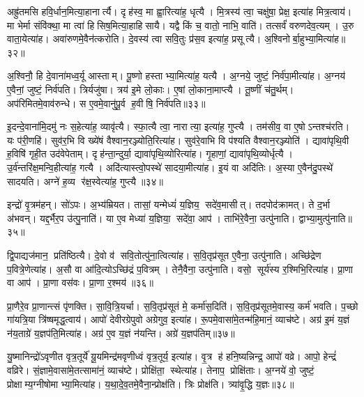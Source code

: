 अह्रु॑तमसि हवि॒र्धान॒मित्या॒हानार्त्यै।
दृह॑स्व॒ मा ह्वा॒रित्या॑ह॒ धृत्यै।
मि॒त्रस्य॑ त्वा॒ चक्षु॑षा॒ प्रेक्ष॒ इत्या॑ह मित्र॒त्वाय॑।
मा भेर्मा संवि॑क्था॒ मा त्वा॑ हिसिष॒मित्या॒हाहिसायै।
यद्वै किं च॒ वातो॒ नाभि॒ वाति॑।
तत्सर्वं॑ वरुणदेव॒त्यम्।
उ॒रु वाता॒येत्या॑ह।
अवा॑रुणमे॒वैन॑त्करोति।
दे॒वस्य॑ त्वा सवि॒तुः प्र॑स॒व इत्या॑ह॒ प्रसूत्यै।
अ॒श्विनोर्बा॒हुभ्या॒मित्या॑ह॥३२॥

अ॒श्विनौ॒ हि दे॒वाना॑मध्व॒र्यू आस्ताम्।
पू॒ष्णो हस्ताभ्या॒मित्या॑ह॒ यत्यै।
अ॒ग्नये॒ जुष्टं॒ निर्व॑पा॒मीत्या॑ह।
अ॒ग्नय॑ ए॒वैनां॒ जुष्टं॒ निर्व॑पति।
त्रिर्यजु॑षा।
त्रय॑ इ॒मे लो॒काः।
ए॒षां लो॒काना॒माप्त्यै।
तू॒ष्णीं च॑तु॒र्थम्।
अप॑रिमितमे॒वाव॑रुन्धे।
स ए॒वमे॒वानु॑पू॒र्व ह॒वीषि॒ निर्व॑पति॥३३॥

इ॒दन्दे॒वाना॑मि॒दमु॑ नः स॒हेत्या॑ह॒ व्यावृ॑त्यै।
स्फा॒त्यै त्वा॒ नारात्या॒ इत्या॑ह॒ गुप्त्यै।
तम॑सीव॒ वा ए॒षोऽन्तश्च॑रति।
यः प॑री॒णहि॑।
सुव॑र॒भि वि ख्ये॑षं वैश्वान॒रञ्ज्योति॒रित्या॑ह।
सुव॑रे॒वाभि वि प॑श्यति वैश्वान॒रञ्ज्योति॑।
द्यावा॑पृथि॒वी ह॒विषि॑ गृही॒त उद॑वेपेताम्।
दृह॑न्ता॒न्दुर्या॒ द्यावा॑पृथि॒व्योरित्या॑ह।
गृ॒हाणां॒ द्यावा॑पृथि॒व्योर्धृत्यै।
उ॒र्व॑न्तरि॑क्ष॒मन्वि॒हीत्या॑ह॒ गत्यै।
अदि॑त्यास्त्वो॒पस्थे॑ सादया॒मीत्या॑ह।
इ॒यं वा अदि॑तिः।
अ॒स्या ए॒वैन॑दु॒पस्थे॑ सादयति।
अग्ने॑ ह॒व्य र॑क्ष॒स्वेत्या॑ह॒ गुप्त्यै॥३४॥\anuvakamend[य॒ज्ञो वा आपो॒ धाम॑ प्र॒णीय॒ प्रच॑रत्यती॒यादे॒तद्बा॒हुभ्या॒मित्या॑ह ह॒वीषि॒ निर्व॑पति॒ गत्यै॑ च॒त्वारि॑ च]

इन्द्रो॑ वृ॒त्रम॑हन्।
सो॑ऽपः।
अ॒भ्य॑म्रियत।
तासां॒ यन्मेध्यं॑ य॒ज्ञिय॒ सदे॑व॒मासीत्।
तदपोद॑क्रामत्।
ते द॒र्भा अ॑भवन्।
यद्द॒र्भैर॒प उ॑त्पु॒नाति॑।
या ए॒व मेध्या॑ य॒ज्ञिया॒ सदे॑वा॒ आप॑।
ताभि॑रे॒वैना॒ उत्पु॑नाति।
द्वाभ्या॒मुत्पु॑नाति॥३५॥

द्वि॒पाद्यज॑मान॒ प्रति॑ष्ठित्यै।
दे॒वो व॑ सवि॒तोत्पु॑ना॒त्वित्या॑ह।
स॒वि॒तृप्र॑सूत ए॒वैना॒ उत्पु॑नाति।
अच्छि॑द्रेण प॒वित्रे॒णेत्या॑ह।
अ॒सौ वा आ॑दि॒त्योऽच्छि॑द्रं प॒वित्रम्।
तेनै॒वैना॒ उत्पु॑नाति।
वसो॒ सूर्य॑स्य र॒श्मिभि॒रित्या॑ह।
प्रा॒णा वा आप॑।
प्रा॒णा वस॑वः।
प्रा॒णा र॒श्मय॑॥३६॥

प्रा॒णैरे॒व प्रा॒णान्त्सं पृ॑णक्ति।
सा॒वि॒त्रि॒यर्चा।
स॒वि॒तृप्र॑सूतं मे॒ कर्मा॑स॒दिति॑।
स॒वि॒तृप्र॑सूतमे॒वास्य॒ कर्म॑ भवति।
प॒च्छो गा॑यत्रि॒या त्रि॑ष्षमृद्ध॒त्वाय॑।
आपो॑ देवीरग्रेपुवो अग्रेगुव॒ इत्या॑ह।
रू॒पमे॒वासा॑मे॒तन्म॑हि॒मानं॒ व्याच॑ष्टे।
अग्र॑ इ॒मं य॒ज्ञं न॑य॒ताग्रे॑ य॒ज्ञप॑ति॒मित्या॑ह।
अग्र॑ ए॒व य॒ज्ञं न॑यन्ति।
अग्रे॑ य॒ज्ञप॑तिम्॥३७॥

यु॒ष्मानिन्द्रो॑ऽवृणीत वृत्र॒तूर्ये॑ यू॒यमिन्द्र॑मवृणीध्वं वृत्र॒तूर्य॒ इत्या॑ह।
वृ॒त्र ह॑ हनि॒ष्यन्निन्द्र॒ आपो॑ वव्रे।
आपो॒ हेन्द्रं॑ वव्रिरे।
सं॒ज्ञामे॒वासा॑मे॒तत्सामा॑नं॒ व्याच॑ष्टे।
प्रोक्षि॑ता॒ स्थेत्या॑ह।
तेनाप॒ प्रोक्षि॑ताः।
अ॒ग्नये॑ वो॒ जुष्टं॒ प्रोक्षाम्य॒ग्नीषोमाभ्या॒मित्या॑ह।
य॒था॒दे॒व॒तमे॒वैना॒न्प्रोक्ष॑ति।
त्रिः प्रोक्ष॑ति।
त्र्या॑वृ॒द्धि य॒ज्ञः॥३८॥

